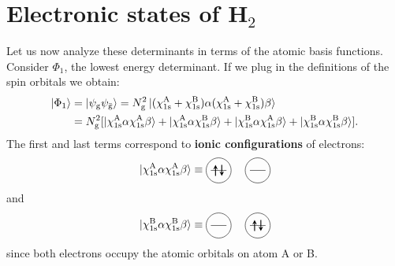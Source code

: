 \documentclass[../Main/chem532-notes.tex]{subfiles}
\begin{document}
\section{Electronic states of H$_2$}
Let us now analyze these determinants in terms of the atomic basis functions.
Consider $\Phi_1$, the lowest energy determinant.
If we plug in the definitions of the spin orbitals we obtain:
\begin{equation}
\begin{split}
\ket{\Phi_1} &= \ket{\psi_{\mathrm{g}} \psi_{\bar{\mathrm{g}}}} = N_{\mathrm{g}}^2 \ket{ (\chi_{1\rm s}^{\rm A} + \chi_{1\rm s}^{\rm B}) \alpha  (\chi_{1\rm s}^{\rm A} + \chi_{1\rm s}^{\rm B}) \beta} \\
&= N_{\mathrm{g}}^2 [ \ket{\chi_{1\rm s}^{\rm A}\alpha \chi_{1\rm s}^{\rm A}\beta}
+ \ket{\chi_{1\rm s}^{\rm A}\alpha \chi_{1\rm s}^{\rm B}\beta}
+ \ket{\chi_{1\rm s}^{\rm B}\alpha \chi_{1\rm s}^{\rm A}\beta} 
+\ket{\chi_{1\rm s}^{\rm B}\alpha \chi_{1\rm s}^{\rm B}\beta}].
\end{split}
\end{equation}
The first and last terms correspond to \textbf{ionic configurations} of electrons: 
\begin{equation}
 \ket{\chi_{1\rm s}^{\rm A}\alpha \chi_{1\rm s}^{\rm A}\beta} \equiv 
 \begin{tikzpicture}[baseline={([yshift=-.5ex]current bounding box.center)},vertex/.style={anchor=base, minimum size=18pt, inner sep=2pt}]
    \draw (0.25,0.5) circle (0.4);
    \draw (0,0.5) -- (0.5,0.5);
    \draw[thick,->,>=stealth] (0.15,0.325) -- (0.15,0.675);
    \draw[thick,<-,>=stealth] (0.35,0.325) -- (0.35,0.675);    
    \draw (1.5,0.5) circle (0.4);
    \draw (1.25,0.5) -- (1.75,0.5);
  \end{tikzpicture}
\end{equation}
and
\begin{equation}
 \ket{\chi_{1\rm s}^{\rm B}\alpha \chi_{1\rm s}^{\rm B}\beta} \equiv 
 \begin{tikzpicture}[baseline={([yshift=-.5ex]current bounding box.center)},vertex/.style={anchor=base, minimum size=18pt, inner sep=2pt}]
    \draw (0.25,0.5) circle (0.4);
    \draw (0,0.5) -- (0.5,0.5);
    \draw[thick,->,>=stealth] (1.4,0.325) -- (1.4,0.675);
    \draw (1.5,0.5) circle (0.4);
    \draw (1.25,0.5) -- (1.75,0.5);
    \draw[thick,<-,>=stealth] (1.6,0.325) -- (1.6,0.675);
  \end{tikzpicture}
\end{equation}
since both electrons occupy the atomic orbitals on atom A or B.
\end{document}
